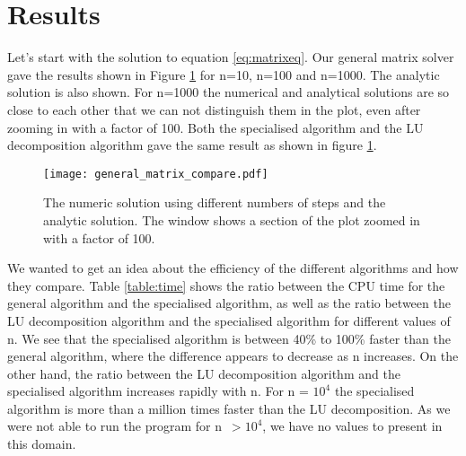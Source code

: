 \section{Results}
\label{sec:results}


%
%

Let's start with the solution to equation \ref{eq:matrixeq}. Our general matrix solver gave the results shown in Figure \ref{fig:compare} for n=10, n=100 and n=1000. The analytic solution is also shown. For n=1000 the numerical and analytical solutions are so close to each other that we can not distinguish them in the plot, even after zooming in with a factor of 100. Both the specialised algorithm and the LU decomposition algorithm gave the same result as shown in figure \ref{fig:compare}.
\begin{figure}[htbp]
	\centering
	\texttt{[image: general\_matrix\_compare.pdf]}
	\caption{The numeric solution using different numbers of steps and the analytic solution. The window shows a section of the plot zoomed in with a factor of 100.}
	\label{fig:compare}
\end{figure}

We wanted to get an idea about the efficiency of the different algorithms and how they compare. Table \ref{table:time} shows the ratio between the CPU time for the general algorithm and the specialised algorithm, as well as the ratio between the LU decomposition algorithm and the specialised algorithm for different values of n. We see that the specialised algorithm is between 40\% to 100\% faster than the general algorithm, where the difference appears to decrease as n increases. On the other hand, the ratio between the LU decomposition algorithm and the specialised algorithm increases rapidly with n. For n = $10^4$ the specialised algorithm is more than a million times faster than the LU decomposition. As we were not able to run the program for n $\,>10^4$, we have no values to present in this domain.

